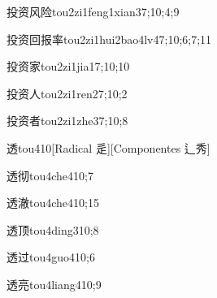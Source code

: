 \begin{verbete}{投资风险}{tou2zi1feng1xian3}{7;10;4;9}
\end{verbete}

\begin{verbete}{投资回报率}{tou2zi1hui2bao4lv4}{7;10;6;7;11}
\end{verbete}

\begin{verbete}{投资家}{tou2zi1jia1}{7;10;10}
\end{verbete}

\begin{verbete}{投资人}{tou2zi1ren2}{7;10;2}
\end{verbete}

\begin{verbete}{投资者}{tou2zi1zhe3}{7;10;8}
\end{verbete}

\begin{verbete}{透}{tou4}{10}[Radical 辵][Componentes 辶秀]
\end{verbete}

\begin{verbete}{透彻}{tou4che4}{10;7}
\end{verbete}

\begin{verbete}{透澈}{tou4che4}{10;15}
\end{verbete}

\begin{verbete}{透顶}{tou4ding3}{10;8}
\end{verbete}

\begin{verbete}{透过}{tou4guo4}{10;6}
\end{verbete}

\begin{verbete}{透亮}{tou4liang4}{10;9}
\end{verbete}

